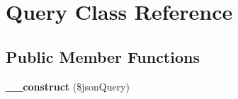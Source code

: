 \hypertarget{class_query}{\section{Query Class Reference}
\label{class_query}
}
\subsection*{Public Member Functions}
\begin{DoxyCompactItemize}
\item 
\hypertarget{class_query_a99049b08407d9ef80fdececc218494ad}{{\bfseries \+\_\+\+\_\+construct} (\$json\+Query)}\label{class_query_a99049b08407d9ef80fdececc218494ad}

\end{DoxyCompactItemize}
